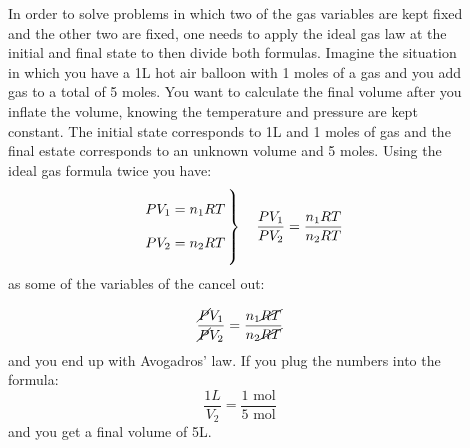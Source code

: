 \documentclass[main.tex]{subfiles}
\begin{document}
\begin{description}
\item[] 
In order to solve problems in which two of the gas variables are kept fixed and the other two are fixed, one needs to apply the ideal gas law at the initial and final state to then divide both formulas. Imagine the situation in which you have a 1L hot air balloon with 1 moles of a gas and you add gas to a total of 5 moles. You want to calculate the final volume after you inflate the volume, knowing the temperature and pressure are kept constant. The initial state corresponds to 1L and 1 moles of gas and the  final estate corresponds to an unknown volume and 5 moles. Using the ideal gas formula twice you have:
\begin{equation}
  \left.
  \raisebox{0pt}[30pt]{\smash{$\begin{array}{r@{}l@{\,}l}
   &  PV_1=n_1RT \\
   \\ 
    & PV_2=n_2RT \\
  \end{array}$}}
  \right\} \quad \frac{PV_1}{PV_2}=\frac{n_1RT}{n_2RT} 
\end{equation}
as some of the variables of the cancel out:

\begin{equation}
\frac{\cancel{P}V_1}{\cancel{P}V_2}=\frac{n_1\cancel{RT}}{n_2\cancel{RT}} 
\end{equation}
and you end up with Avogadros' law. If you plug the numbers into the formula:
\begin{equation}
\frac{1L}{V_2}=\frac{1 \text{ mol}}{5 \text{ mol}} 
\end{equation}
and you get a final volume of 5L.


\end{description}
\end{document}
